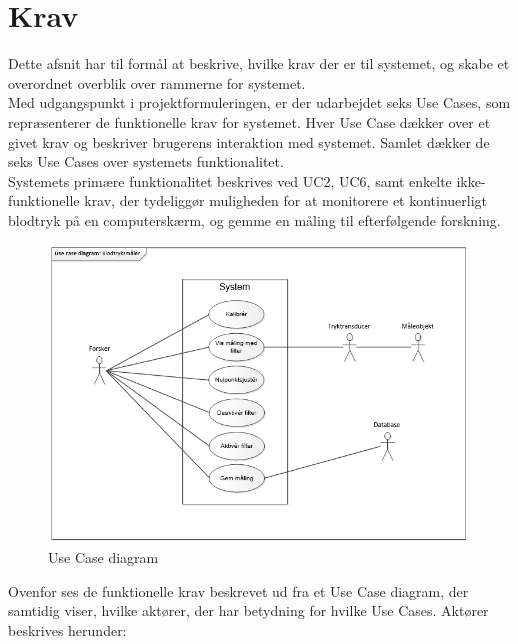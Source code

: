 \chapter{Krav}
Dette afsnit har til formål at beskrive, hvilke krav der er til systemet, og skabe et overordnet overblik over rammerne for systemet. \\
Med udgangspunkt i projektformuleringen, er der udarbejdet seks Use Cases, som repræsenterer de funktionelle krav for systemet. Hver Use Case dækker over et givet krav og beskriver brugerens interaktion med systemet. Samlet dækker de seks Use Cases over systemets funktionalitet.\\
Systemets primære funktionalitet beskrives ved UC2, UC6, samt enkelte ikke-funktionelle krav, der tydeliggør muligheden for at monitorere et kontinuerligt blodtryk på en computerskærm, og gemme en måling til efterfølgende forskning.

\begin{figure}[H]
	\centering
	\includegraphics[width=1\textwidth]{Figurer/1}
	\caption{Use Case diagram}
\end{figure}

Ovenfor ses de funktionelle krav beskrevet ud fra et Use Case diagram, der samtidig viser, hvilke aktører, der har betydning for hvilke Use Cases.  Aktører beskrives herunder:
\\\\


